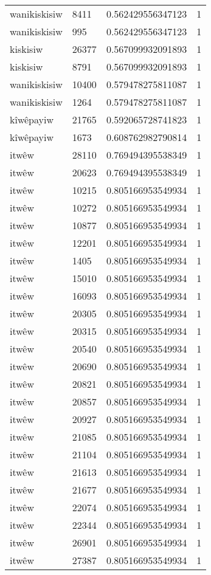\begin{longtable}{llll}
wanikiskisiw & 8411 & 0.562429556347123 & 1 \\
wanikiskisiw & 995 & 0.562429556347123 & 1 \\
kiskisiw & 26377 & 0.567099932091893 & 1 \\
kiskisiw & 8791 & 0.567099932091893 & 1 \\
wanikiskisiw & 10400 & 0.579478275811087 & 1 \\
wanikiskisiw & 1264 & 0.579478275811087 & 1 \\
kîwêpayiw & 21765 & 0.592065728741823 & 1 \\
kîwêpayiw & 1673 & 0.608762982790814 & 1 \\
itwêw & 28110 & 0.769494395538349 & 1 \\
itwêw & 20623 & 0.769494395538349 & 1 \\
itwêw & 10215 & 0.805166953549934 & 1 \\
itwêw & 10272 & 0.805166953549934 & 1 \\
itwêw & 10877 & 0.805166953549934 & 1 \\
itwêw & 12201 & 0.805166953549934 & 1 \\
itwêw & 1405 & 0.805166953549934 & 1 \\
itwêw & 15010 & 0.805166953549934 & 1 \\
itwêw & 16093 & 0.805166953549934 & 1 \\
itwêw & 20305 & 0.805166953549934 & 1 \\
itwêw & 20315 & 0.805166953549934 & 1 \\
itwêw & 20540 & 0.805166953549934 & 1 \\
itwêw & 20690 & 0.805166953549934 & 1 \\
itwêw & 20821 & 0.805166953549934 & 1 \\
itwêw & 20857 & 0.805166953549934 & 1 \\
itwêw & 20927 & 0.805166953549934 & 1 \\
itwêw & 21085 & 0.805166953549934 & 1 \\
itwêw & 21104 & 0.805166953549934 & 1 \\
itwêw & 21613 & 0.805166953549934 & 1 \\
itwêw & 21677 & 0.805166953549934 & 1 \\
itwêw & 22074 & 0.805166953549934 & 1 \\
itwêw & 22344 & 0.805166953549934 & 1 \\
itwêw & 26901 & 0.805166953549934 & 1 \\
itwêw & 27387 & 0.805166953549934 & 1 \\

\end{longtable}
